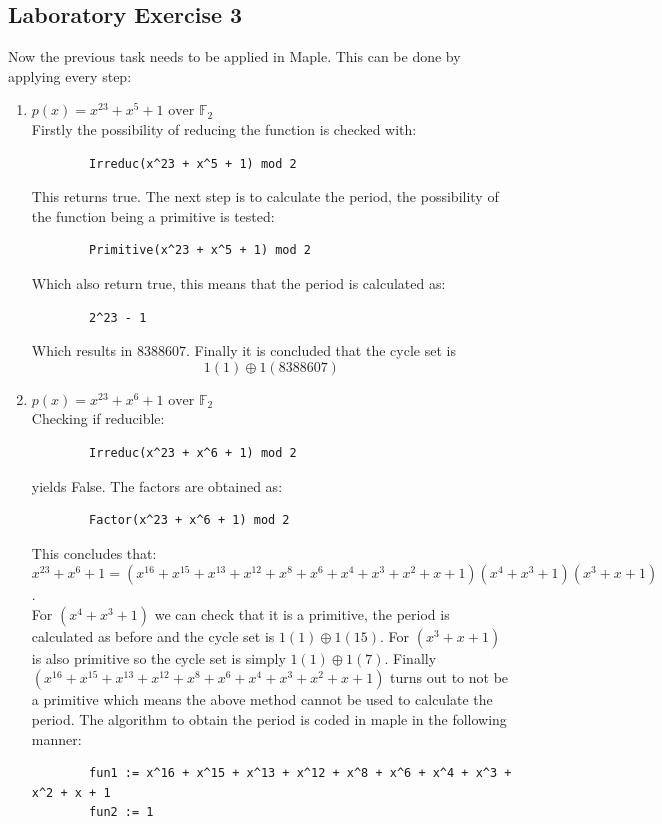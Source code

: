 \documentclass{article}
\begin{document}
\subsection{Laboratory Exercise 3}
Now the previous task needs to be applied in Maple. This can be done by applying every step: 
\begin{enumerate}
    \item $p(x) = x^{23} + x^5 + 1 \text{ over } \mathbb F_2$ \\
    Firstly the possibility of reducing the function is checked with:
    \begin{verbatim}
        Irreduc(x^23 + x^5 + 1) mod 2
    \end{verbatim}
    This returns true. The next step is to calculate the period, the possibility of the function being a primitive is tested:
    \begin{verbatim}
        Primitive(x^23 + x^5 + 1) mod 2
    \end{verbatim}
    Which also return true, this means that the period is calculated as:
    \begin{verbatim}
        2^23 - 1
    \end{verbatim}
    Which results in 8388607. Finally it is concluded that the cycle set is
    $$1(1) \oplus 1(8388607)$$
    
    \item $p(x) = x^{23} + x^6 + 1 \text{ over } \mathbb F_2$ \\
    Checking if reducible:
    \begin{verbatim}
        Irreduc(x^23 + x^6 + 1) mod 2
    \end{verbatim}
    yields False. The factors are obtained as:
    \begin{verbatim}
        Factor(x^23 + x^6 + 1) mod 2
    \end{verbatim}
    This concludes that: $x^{23} + x^6 + 1 = (x^{16} + x^{15} + x^{13} + x^{12} + x^8 + x^6 + x^4 + x^3 + x^2 + x + 1)(x^4 + x^3 + 1)(x^3 + x + 1)$. \\
    For $(x^4 + x^3 + 1)$ we can check that it is a primitive, the period is calculated as before and the cycle set is $1(1) \oplus 1(15)$. For $(x^3 + x + 1)$ is also primitive so the cycle set is simply $1(1) \oplus 1(7)$. 
    Finally $(x^{16} + x^{15} + x^{13} + x^{12} + x^8 + x^6 + x^4 + x^3 + x^2 + x + 1)$ turns out to not be a primitive which means the above method cannot be used to calculate the period. The algorithm to obtain the period is coded in maple in the following manner:
    \begin{verbatim}
        fun1 := x^16 + x^15 + x^13 + x^12 + x^8 + x^6 + x^4 + x^3 + x^2 + x + 1
        fun2 := 1
        

\end{verbatim}
\end{enumerate}
\end{document}
